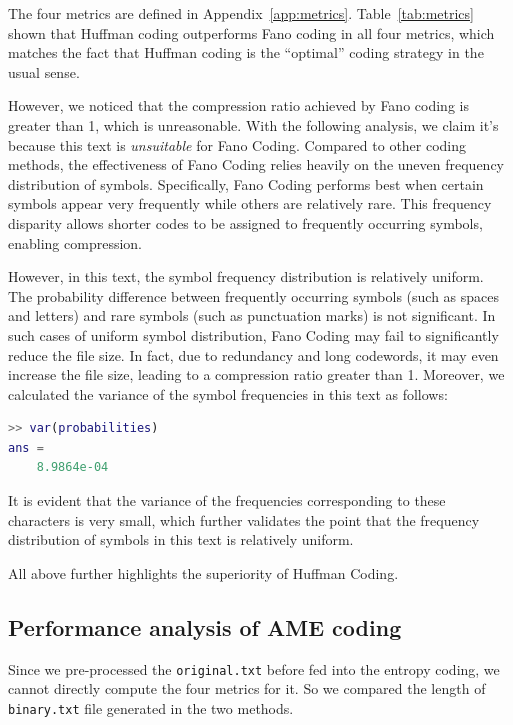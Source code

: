 \documentclass[12pt,twoside]{article}
\begin{document}
The four metrics are defined in Appendix~\ref{app:metrics}. Table~\ref{tab:metrics} shown that Huffman coding outperforms Fano coding in all four metrics, which matches the fact that Huffman coding is the ``optimal'' coding strategy in the usual sense.

However, we noticed that the compression ratio achieved by Fano coding is greater than 1, which is unreasonable. With the following analysis, we claim it's because this text is \textit{unsuitable} for Fano Coding. Compared to other coding methods, the effectiveness of Fano Coding relies heavily on the uneven frequency distribution of symbols. Specifically, Fano Coding performs best when certain symbols appear very frequently while others are relatively rare. This frequency disparity allows shorter codes to be assigned to frequently occurring symbols, enabling compression.

However, in this text, the symbol frequency distribution is relatively uniform. The probability difference between frequently occurring symbols (such as spaces and letters) and rare symbols (such as punctuation marks) is not significant. In such cases of uniform symbol distribution, Fano Coding may fail to significantly reduce the file size. In fact, due to redundancy and long codewords, it may even increase the file size, leading to a compression ratio greater than 1. Moreover, we calculated the variance of the symbol frequencies in this text as follows:

\begin{lstlisting}[language=Matlab, style=custommatlab]
>> var(probabilities)
ans = 
    8.9864e-04
\end{lstlisting}

It is evident that the variance of the frequencies corresponding to these characters is very small, which further validates the point that the frequency distribution of symbols in this text is relatively uniform.

All above further highlights the superiority of Huffman Coding.

\subsection{Performance analysis of AME coding}

Since we pre-processed the \texttt{original.txt} before fed into the entropy coding, we cannot directly compute the four metrics for it. So we compared the length of \texttt{binary.txt} file generated in the two methods. 
\end{document}
